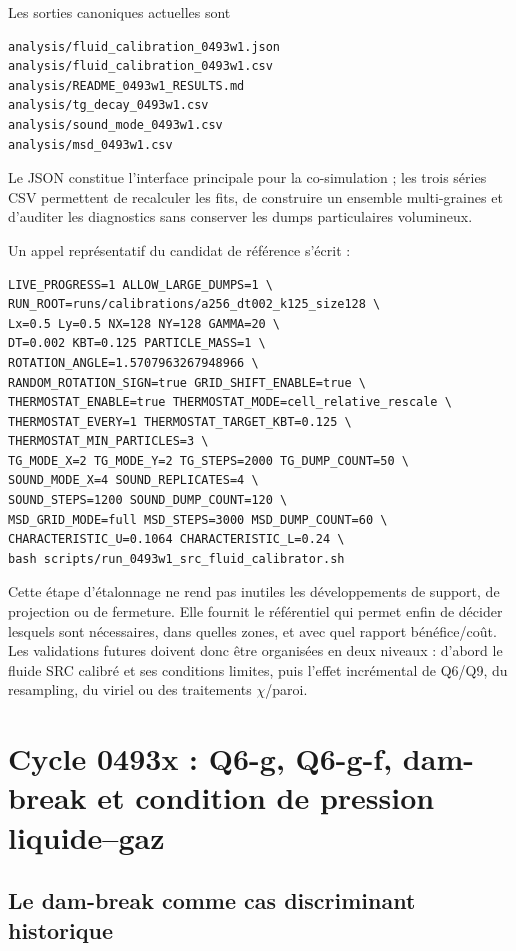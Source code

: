 \documentclass[11pt,a4paper]{article}
\begin{document}
Les sorties canoniques actuelles sont
\begin{verbatim}
analysis/fluid_calibration_0493w1.json
analysis/fluid_calibration_0493w1.csv
analysis/README_0493w1_RESULTS.md
analysis/tg_decay_0493w1.csv
analysis/sound_mode_0493w1.csv
analysis/msd_0493w1.csv
\end{verbatim}
Le JSON constitue l'interface principale pour la co-simulation ; les trois séries CSV permettent de recalculer les fits, de construire un ensemble multi-graines et d'auditer les diagnostics sans conserver les dumps particulaires volumineux.

Un appel représentatif du candidat de référence s'écrit :
\begin{verbatim}
LIVE_PROGRESS=1 ALLOW_LARGE_DUMPS=1 \
RUN_ROOT=runs/calibrations/a256_dt002_k125_size128 \
Lx=0.5 Ly=0.5 NX=128 NY=128 GAMMA=20 \
DT=0.002 KBT=0.125 PARTICLE_MASS=1 \
ROTATION_ANGLE=1.5707963267948966 \
RANDOM_ROTATION_SIGN=true GRID_SHIFT_ENABLE=true \
THERMOSTAT_ENABLE=true THERMOSTAT_MODE=cell_relative_rescale \
THERMOSTAT_EVERY=1 THERMOSTAT_TARGET_KBT=0.125 \
THERMOSTAT_MIN_PARTICLES=3 \
TG_MODE_X=2 TG_MODE_Y=2 TG_STEPS=2000 TG_DUMP_COUNT=50 \
SOUND_MODE_X=4 SOUND_REPLICATES=4 \
SOUND_STEPS=1200 SOUND_DUMP_COUNT=120 \
MSD_GRID_MODE=full MSD_STEPS=3000 MSD_DUMP_COUNT=60 \
CHARACTERISTIC_U=0.1064 CHARACTERISTIC_L=0.24 \
bash scripts/run_0493w1_src_fluid_calibrator.sh
\end{verbatim}

Cette étape d'étalonnage ne rend pas inutiles les développements de support, de projection ou de fermeture. Elle fournit le référentiel qui permet enfin de décider lesquels sont nécessaires, dans quelles zones, et avec quel rapport bénéfice/coût. Les validations futures doivent donc être organisées en deux niveaux : d'abord le fluide SRC calibré et ses conditions limites, puis l'effet incrémental de Q6/Q9, du resampling, du viriel ou des traitements $\chi$/paroi.



\section{Cycle 0493x : Q6-g, Q6-g-f, dam-break et condition de pression liquide--gaz}
\label{sec:q6g-dambreak}

\subsection{Le dam-break comme cas discriminant historique}
\end{document}
